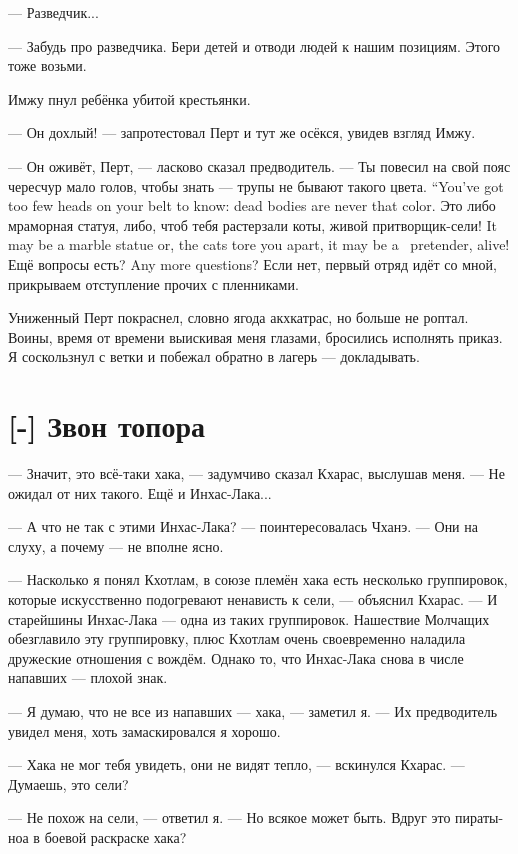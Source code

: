 --- Разведчик...

--- Забудь про разведчика.
Бери детей и отводи людей к нашим позициям.
Этого тоже возьми.

Имжу пнул ребёнка убитой крестьянки.

--- Он дохлый! --- запротестовал Перт и тут же осёкся, увидев взгляд Имжу.

--- Он оживёт, Перт, --- ласково сказал предводитель.
{--- Ты повесил на свой пояс чересчур мало голов, чтобы знать --- трупы не бывают такого цвета.}
{``You've got too few heads on your belt to know: dead bodies are never that color.}
{Это либо мраморная статуя, либо, чтоб тебя растерзали коты, живой притворщик-сели!}
{It may be a marble statue or, the cats tore you apart, it may be a \Seli\ pretender, alive!}
{Ещё вопросы есть?}
{Any more questions?}
Если нет, первый отряд идёт со мной, прикрываем отступление прочих с пленниками.

Униженный Перт покраснел, словно ягода акхкатрас, но больше не роптал.
Воины, время от времени выискивая меня глазами, бросились исполнять приказ.
Я соскользнул с ветки и побежал обратно в лагерь --- докладывать.

\section{[-] Звон топора}

--- Значит, это всё-таки хака, --- задумчиво сказал Кхарас, выслушав меня.
--- Не ожидал от них такого.
Ещё и Инхас-Лака...

--- А что не так с этими Инхас-Лака? --- поинтересовалась Чханэ.
--- Они на слуху, а почему --- не вполне ясно.

--- Насколько я понял Кхотлам, в союзе племён хака есть несколько группировок, которые искусственно подогревают ненависть к сели, --- объяснил Кхарас.
--- И старейшины Инхас-Лака --- одна из таких группировок.
Нашествие Молчащих обезглавило эту группировку, плюс Кхотлам очень своевременно наладила дружеские отношения с вождём.
Однако то, что Инхас-Лака снова в числе напавших --- плохой знак.

--- Я думаю, что не все из напавших --- хака, --- заметил я.
--- Их предводитель увидел меня, хоть замаскировался я хорошо.

--- Хака не мог тебя увидеть, они не видят тепло, --- вскинулся Кхарас.
--- Думаешь, это сели?

--- Не похож на сели, --- ответил я.
--- Но всякое может быть.
Вдруг это пираты-ноа в боевой раскраске хака?

